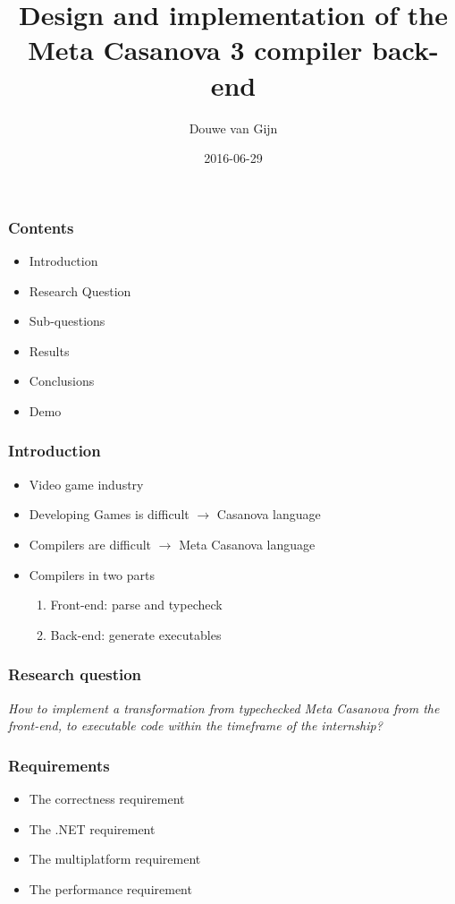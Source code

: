 \documentclass[xetex,serif,aspectratio=169]{beamer}
\title{Design and implementation of the\\Meta Casanova 3 compiler back-end}
\author{Douwe van Gijn}
\date{2016-06-29}
\begin{document}
\begin{frame}
\titlepage

\end{frame}\begin{frame}\frametitle{Contents}
\begin{itemize}
    \item Introduction
    \item Research Question
    \item Sub-questions
    \item Results
    \item Conclusions
    \item Demo
\end{itemize}

\end{frame}\begin{frame}\frametitle{Introduction}
\begin{itemize}
    \item Video game industry
    \item Developing Games is difficult $\longrightarrow$ Casanova language
    \item Compilers are difficult $\longrightarrow$ Meta Casanova language
    \item Compilers in two parts
    \begin{enumerate}
        \item Front-end: parse and typecheck
        \item Back-end: generate executables
    \end{enumerate}
\end{itemize}

\end{frame}\begin{frame}\frametitle{Research question}
\textit{How to implement a transformation from typechecked Meta Casanova from the front-end, to executable code within the timeframe of the internship?}

\end{frame}\begin{frame}\frametitle{Requirements}
\begin{itemize}
    \item The correctness requirement
    \item The .NET requirement
    \item The multiplatform requirement
    \item The performance requirement
\end{itemize}


\end{frame}
\end{document}
